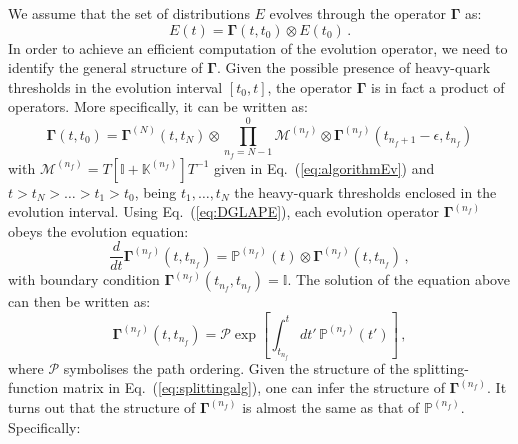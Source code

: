 \documentclass[10pt,a4paper]{article}
\begin{document}
We assume that the set of distributions $E$ evolves through the
operator ${\bm\Gamma}$ as:
\begin{equation}
  E(t) = {\bm\Gamma}(t,t_0)\otimes E(t_0)\,.
\end{equation}
In order to achieve an efficient computation of the evolution
operator, we need to identify the general structure of ${\bm \Gamma}$.
Given the possible presence of heavy-quark thresholds in the evolution
interval $[t_0,t]$, the operator ${\bm\Gamma}$ is in fact a product of
operators. More specifically, it can be written as:
\begin{equation}
{\bm\Gamma}(t,t_0)= {\bm\Gamma}^{(N)}(t,t_N)
\otimes\prod_{n_f=N-1}^{0}
\mathcal{M}^{(n_f)}\otimes{\bm\Gamma}^{(n_f)}(t_{n_f+1}-\epsilon,t_{n_f})
\label{eq:conbevop}
\end{equation}
with
$\mathcal{M}^{(n_f)} =
T\left[\mathbb{I}+\mathbb{K}^{(n_f)}\right]T^{-1}$
given in Eq.~(\ref{eq:algorithmEv}) and $t>t_N>\dots>t_1>t_0$, being
$t_1,\dots,t_N$ the heavy-quark thresholds enclosed in the evolution
interval. Using Eq.~(\ref{eq:DGLAPE}), each evolution operator
${\bm\Gamma}^{(n_f)}$ obeys the evolution equation:
\begin{equation}
  \frac{d}{dt}{\bm\Gamma}^{(n_f)}(t,t_{n_f}) =
  \mathbb{P}^{(n_f)}(t)\otimes {\bm\Gamma}^{(n_f)}(t,t_{n_f})\,,
\label{eq:DGLAPG}
\end{equation}
with boundary condition
${\bm\Gamma}^{(n_f)}(t_{n_f},t_{n_f})=\mathbb{I}$. The solution of the
equation above can then be written as:
\begin{equation}
  {\bm\Gamma}^{(n_f)}(t,t_{n_f}) = \mathcal{P}\exp\left[\int_{t_{n_f}}^tdt'\,\mathbb{P}^{(n_f)}(t')\right]\,,
\end{equation}
where $\mathcal{P}$ symbolises the path ordering. Given the structure
of the splitting-function matrix in Eq.~(\ref{eq:splittingalg}), one
can infer the structure of ${\bm \Gamma}^{(n_f)}$. It turns out that
the structure of ${\bm \Gamma^{(n_f)}}$ is almost the same as that of
$\mathbb{P}^{(n_f)}$. Specifically:
\end{document}
